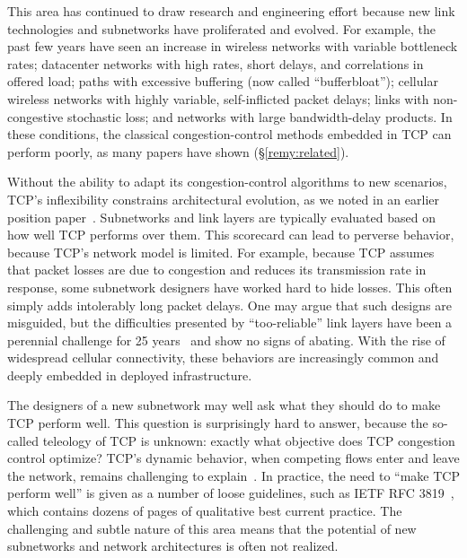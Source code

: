 This area has continued to draw research and engineering effort
because new link technologies and subnetworks have proliferated and
evolved. For example, the past few years have seen an increase in
wireless networks with variable bottleneck rates; datacenter networks
with high rates, short delays, and correlations in offered load; paths
with excessive buffering (now called ``bufferbloat''); cellular
wireless networks with highly variable, self-inflicted packet delays;
links with non-congestive stochastic loss; and networks with large
bandwidth-delay products. In these conditions, the classical
congestion-control methods embedded in TCP can perform poorly, as many
papers have shown (\S\ref{remy:related}).


Without the ability to adapt its congestion-control algorithms to new
scenarios, TCP's inflexibility constrains architectural evolution, as
we noted in an earlier position paper~\cite{hotnets2011}. Subnetworks
and link layers are typically evaluated based on how well TCP performs
over them.  This scorecard can lead to perverse behavior, because
TCP's network model is limited. For example, because TCP assumes that
packet losses are due to congestion and reduces its transmission rate
in response, some subnetwork designers have worked hard to hide
losses. This often simply adds intolerably long packet delays. One may
argue that such designs are misguided, but the difficulties presented
by ``too-reliable'' link layers have been a perennial challenge for 25
years~\cite{Clark88} and show no signs of abating. With the rise of
widespread cellular connectivity, these behaviors are increasingly
common and deeply embedded in deployed infrastructure.

The designers of a new subnetwork may well ask what they should do to
make TCP perform well. This question is surprisingly hard to answer,
because the so-called teleology of TCP is unknown: exactly what
objective does TCP congestion control optimize? TCP's dynamic
behavior, when competing flows enter and leave the network, remains
challenging to explain~\cite{slowcc}.  In practice, the need to ``make
TCP perform well'' is given as a number of loose guidelines, such as
IETF RFC 3819~\cite{rfc3819}, which contains dozens of pages of
qualitative best current practice. The challenging and subtle nature
of this area means that the potential of new subnetworks and network
architectures is often not realized.

